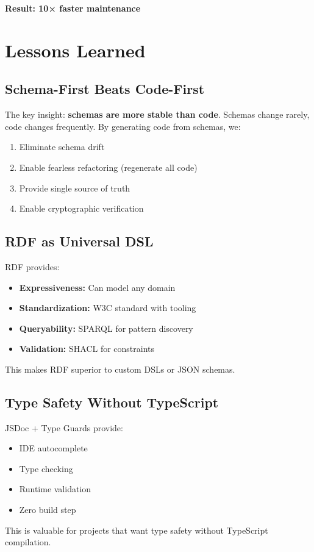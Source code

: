 \textbf{Result: 10× faster maintenance}

\section{Lessons Learned}

\subsection{Schema-First Beats Code-First}

The key insight: \textbf{schemas are more stable than code}. Schemas change rarely, code changes frequently. By generating code from schemas, we:

\begin{enumerate}
    \item Eliminate schema drift
    \item Enable fearless refactoring (regenerate all code)
    \item Provide single source of truth
    \item Enable cryptographic verification
\end{enumerate}

\subsection{RDF as Universal DSL}

RDF provides:
\begin{itemize}
    \item \textbf{Expressiveness:} Can model any domain
    \item \textbf{Standardization:} W3C standard with tooling
    \item \textbf{Queryability:} SPARQL for pattern discovery
    \item \textbf{Validation:} SHACL for constraints
\end{itemize}

This makes RDF superior to custom DSLs or JSON schemas.

\subsection{Type Safety Without TypeScript}

JSDoc + Type Guards provide:
\begin{itemize}
    \item IDE autocomplete
    \item Type checking
    \item Runtime validation
    \item Zero build step
\end{itemize}

This is valuable for projects that want type safety without TypeScript compilation.

